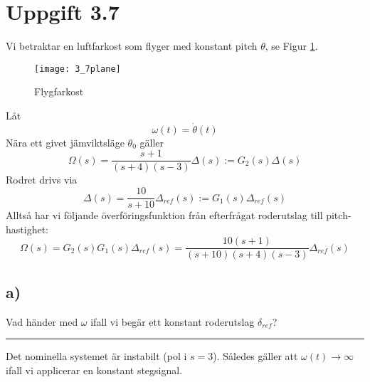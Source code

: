 \documentclass[12pt]{article}
\newcommand{\qline}{\hrule \vspace*{10pt}}
\begin{document}
\section*{Uppgift 3.7}

Vi betraktar en luftfarkost som flyger med konstant pitch $\theta$, se Figur \ref{fig:37plane}. \\
\begin{figure}[h!]
  \centering
  \texttt{[image: 3\_7plane]}
  \caption{Flygfarkost}
  \label{fig:37plane}
\end{figure}
\FloatBarrier
Låt
\[\omega(t) = \dot{\theta}(t)\]
Nära ett givet jämviktsläge $\theta_0$ gäller
\[\Omega (s) = \frac{s+1}{(s+4)(s-3)}\Delta (s) := G_2(s)\Delta(s)\]
Rodret drivs via
\[\Delta (s) = \frac{10}{s + 10}\Delta_{ref}(s) := G_1(s) \Delta_{ref}(s)\]
Alltså har vi följande överföringsfunktion från efterfrågat roderutslag till pitch-hastighet:
\[\Omega(s) = G_2(s)G_1(s)\Delta_{ref}(s) = \frac{10(s+1)}{(s+10)(s+4)(s-3)}\Delta_{ref}(s)\]

\subsection*{a)}
Vad händer med $\omega$ ifall vi begär ett konstant roderutslag $\delta_{ref}$?
\qline
Det nominella systemet är instabilt (pol i $s = 3$). Således gäller att $\omega(t) \to \infty$ ifall vi applicerar en konstant stegsignal.
\end{document}
